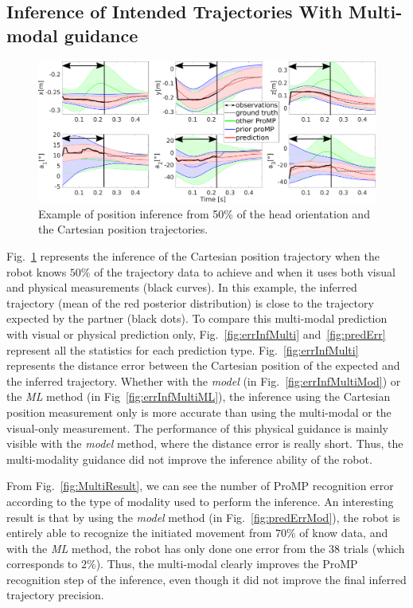 \documentclass[runningheads,a4paper]{llncs}
\begin{document}
\subsection{Inference of Intended Trajectories With Multi-modal guidance}
\begin{figure}
  \centering
	\includegraphics[width=\hsize]{figures/multiN.pdf}
      \caption{Example of position inference from 50\% of the head orientation and the Cartesian position trajectories.\label{fig:infMulti}}
\end{figure} 

Fig.~\ref{fig:infMulti} represents the inference of the Cartesian position trajectory when the robot knows $50\%$ of the trajectory data to achieve and when it uses both visual and physical measurements (black curves). In this example, the inferred trajectory (mean of the red posterior distribution) is close to the trajectory expected by the partner (black dots). To compare this multi-modal prediction with visual or physical prediction only, Fig.~\ref{fig:errInfMulti} and~\ref{fig:predErr} represent all the statistics for each prediction type. Fig.~\ref{fig:errInfMulti}  represents the distance error between the Cartesian position of the expected and the inferred trajectory. Whether with the \textit{model} (in Fig.~\ref{fig:errInfMultiMod}) or the \textit{ML} method (in Fig~\ref{fig:errInfMultiML}), the inference using the Cartesian position measurement only is more accurate than using the multi-modal or the visual-only measurement. The performance of this physical guidance is mainly visible with the \textit{model} method, where the distance error is really short. Thus, the multi-modality guidance did not improve the inference ability of the robot. 

From Fig.~\ref{fig:MultiResult}, we can see the number of ProMP recognition error according to the type of modality used to perform the inference. An interesting result is that by using the \textit{model} method (in Fig.~\ref{fig:predErrMod}), the robot is entirely able to recognize the initiated movement from $70 \%$ of know data, and with the \textit{ML} method, the robot has only done one error from the $38$ trials (which corresponds to $2\%$). Thus, the multi-modal clearly improves the ProMP recognition step of the inference, even though it did not improve the final inferred trajectory precision.
\end{document}
